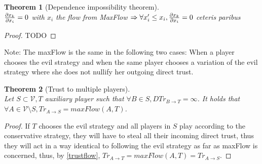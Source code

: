 \documentclass[11pt]{article}
\newtheorem{theorem}{Theorem}[section]
\theoremstyle{definition}
\theoremstyle{corollary}
\theoremstyle{lemma}
\begin{document}
    \begin{theorem}[Dependence impossibility theorem] \ \\
    \label{independence}
       ${\partial x_k \over \partial x_i} = 0$ with $x_i$ the flow from MaxFlow $\Rightarrow
         \forall x_i' \leq x_i, {\partial x_k \over \partial x_i} = 0$ ceteris paribus
    \end{theorem}
    \begin{proof}
       TODO
    \end{proof}
    Note: The maxFlow is the same in the following two cases: When a player chooses the evil strategy and when the same
    player chooses a variation of the evil strategy where she does not nullify her outgoing direct trust.

    \begin{theorem}[Trust to multiple players] \ \\
    \label{trustmany}
       Let $S \subset \mathcal{V}, T$ auxiliary player such that $\forall B \in S, DTr_{B \rightarrow T} = \infty$.
       It holds that $\forall A \in \mathcal{V} \setminus S, Tr_{A \rightarrow S} = maxFlow(A, T)$.
    \end{theorem}       
    \begin{proof}
       If $T$ chooses the evil strategy and all players in $S$ play according to the conservative strategy, they will have to steal
       all their incoming direct trust, thus they will act in a way identical to following the evil strategy as far as
       maxFlow is concerned, thus, by \ref{trustflow}, $Tr_{A \rightarrow T} = maxFlow(A, T) = Tr_{A \rightarrow S}$.
    \end{proof}
\end{document}
